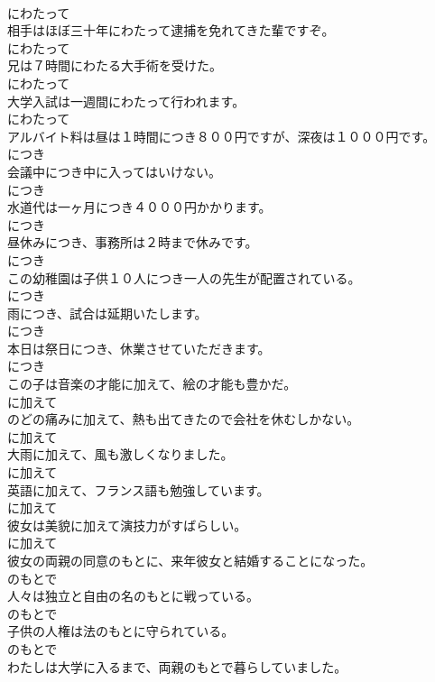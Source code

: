 \documentclass[8pt]{extreport}
\begin{document}
\begin{CJK}{UTF8}{min}
\\	にわたって
\\	相手はほぼ三十年にわたって逮捕を免れてきた輩ですぞ。	
\\	にわたって
\\	兄は７時間にわたる大手術を受けた。	
\\	にわたって
\\	大学入試は一週間にわたって行われます。	
\\	にわたって
\\	アルバイト料は昼は１時間につき８００円ですが、深夜は１０００円です。	
\\	につき
\\	会議中につき中に入ってはいけない。	
\\	につき
\\	水道代は一ヶ月につき４０００円かかります。	
\\	につき
\\	昼休みにつき、事務所は２時まで休みです。	
\\	につき
\\	この幼稚園は子供１０人につき一人の先生が配置されている。	
\\	につき
\\	雨につき、試合は延期いたします。	
\\	につき
\\	本日は祭日につき、休業させていただきます。	
\\	につき
\\	この子は音楽の才能に加えて、絵の才能も豊かだ。	
\\	に加えて
\\	のどの痛みに加えて、熱も出てきたので会社を休むしかない。	
\\	に加えて
\\	大雨に加えて、風も激しくなりました。	
\\	に加えて
\\	英語に加えて、フランス語も勉強しています。	
\\	に加えて
\\	彼女は美貌に加えて演技力がすばらしい。	
\\	に加えて
\\	彼女の両親の同意のもとに、来年彼女と結婚することになった。	
\\	のもとで
\\	人々は独立と自由の名のもとに戦っている。	
\\	のもとで
\\	子供の人権は法のもとに守られている。	
\\	のもとで
\\	わたしは大学に入るまで、両親のもとで暮らしていました。	

\end{CJK}
\end{document}
